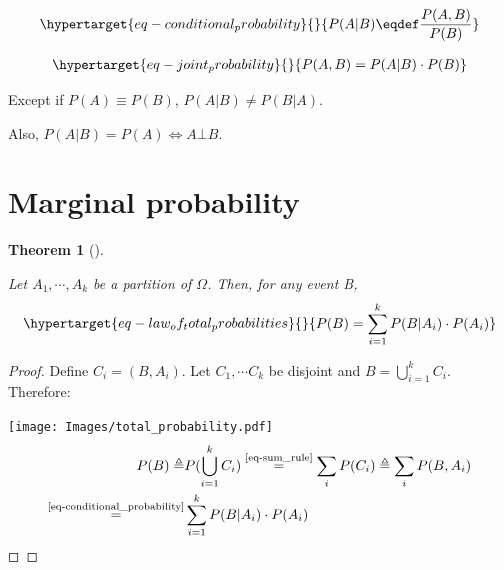 \documentclass[
  letterpaper,
  12pt,
  british]{tufte-book}
\theoremstyle{plain}
\theoremstyle{definition}
\theoremstyle{plain}
\newtheorem{theorem}{Theorem}[chapter]
\theoremstyle{remark}
\begin{document}
\begin{equation}\protect\hypertarget{eq-conditional_probability}{}{\begin{aligned}
P(A|B) \eqdef \frac{P(A,B)}{P(B)}
\end{aligned}}\label{eq-conditional_probability}\end{equation}

\begin{equation}\protect\hypertarget{eq-joint_probability}{}{\begin{aligned}
P(A, B) = P(A|B)\cdot P(B)
\end{aligned}}\label{eq-joint_probability}\end{equation}

Except if \(P(A) \equiv P(B)\), \(P(A|B) \neq P(B|A)\).

Also, \(P(A|B)=P(A) \iff A \bot B\).

\hypertarget{sec-marginalisation}{%
\section{Marginal probability}\label{sec-marginalisation}}

\leavevmode{}%
\begin{theorem}[]\label{thm-marginal_probability}

Let \(A_1, \cdots, A_k\) be a partition of \(\Omega\). Then, for any
\emph{event} B,
\begin{equation}\protect\hypertarget{eq-law_of_total_probabilities}{}{\begin{aligned}
P(B)=\sum_{i=1}^k P(B|A_i)\cdot P(A_i)
\end{aligned}}\label{eq-law_of_total_probabilities}\end{equation}

\end{theorem}

\begin{proof}

Define \(C_i = (B,A_i)\). Let \(C_1, \cdots C_k\) be disjoint and
\(B = \bigcup\limits_{i=1}^k C_i\).\\
Therefore:

\texttt{[image: Images/total\_probability.pdf]} \begin{align}
        P(B) \triangleq &P(\bigcup\limits_{i=1}^k C_i)
        \overset{\text{\ref{eq-sum_rule}}}{=} \sum_i P(C_i) \triangleq \sum_i P(B,A_i) \\
        \overset{\text{\ref{eq-conditional_probability}}}{=} &\sum_{i=1}^k P(B|A_i)\cdot P(A_i) 
\end{align} ◻

\end{proof}
\end{document}
